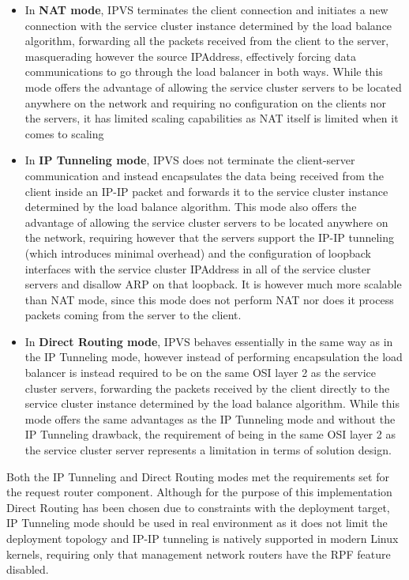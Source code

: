 \begin{itemize}
	\item In \textbf{\gls{NAT} mode}, \gls{IPVS} terminates the client connection and initiates a new connection with the service cluster instance determined by the load balance algorithm, forwarding all the packets received from the client to the server, masquerading however the source \gls{IPAddress}, effectively forcing data communications to go through the load balancer in both ways. While this mode offers the advantage of allowing the service cluster servers to be located anywhere on the network and requiring no configuration on the clients nor the servers, it has limited scaling capabilities as \gls{NAT} itself is limited when it comes to scaling
	\item In \textbf{IP Tunneling mode}, \gls{IPVS} does not terminate the client-server communication and instead encapsulates the data being received from the client inside an IP-IP packet and forwards it to the service cluster instance determined by the load balance algorithm. This mode also offers the advantage of allowing the service cluster servers to be located anywhere on the network, requiring however that the servers support the IP-IP tunneling (which introduces minimal overhead) and the configuration of loopback interfaces with the service cluster \gls{IPAddress} in all of the service cluster servers and disallow \gls{ARP} on that loopback. It is however much more scalable than \gls{NAT} mode, since this mode does not perform \gls{NAT} nor does it process packets coming from the server to the client.
	\item In \textbf{Direct Routing mode}, \gls{IPVS} behaves essentially in the same way as in the IP Tunneling mode, however instead of performing encapsulation the load balancer is instead required to be on the same \gls{OSI} layer 2 as the service cluster servers, forwarding the packets received by the client directly to the service cluster instance determined by the load balance algorithm. While this mode offers the same advantages as the IP Tunneling mode and without the IP Tunneling drawback, the requirement of being in the same \gls{OSI} layer 2 as the service cluster server represents a limitation in terms of solution design.
\end{itemize}	
%
Both the IP Tunneling and Direct Routing modes met the requirements set for the request router component.
Although for the purpose of this implementation Direct Routing has been chosen due to constraints with the deployment target, IP Tunneling mode should be used in real environment as it does not limit the deployment topology and IP-IP tunneling is natively supported in modern Linux kernels, requiring only that management network routers have the \gls{RPF} feature disabled.
